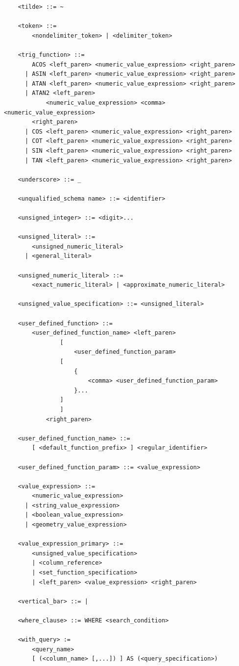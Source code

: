 \documentclass[11pt,a4paper]{ivoa}
\begin{document}
\begin{verbatim}
    <tilde> ::= ~

    <token> ::=
        <nondelimiter_token> | <delimiter_token>

    <trig_function> ::=
        ACOS <left_paren> <numeric_value_expression> <right_paren>
      | ASIN <left_paren> <numeric_value_expression> <right_paren>
      | ATAN <left_paren> <numeric_value_expression> <right_paren>
      | ATAN2 <left_paren>
            <numeric_value_expression> <comma> <numeric_value_expression>
        <right_paren>
      | COS <left_paren> <numeric_value_expression> <right_paren>
      | COT <left_paren> <numeric_value_expression> <right_paren>
      | SIN <left_paren> <numeric_value_expression> <right_paren>
      | TAN <left_paren> <numeric_value_expression> <right_paren>

    <underscore> ::= _

    <unqualified_schema name> ::= <identifier>

    <unsigned_integer> ::= <digit>...

    <unsigned_literal> ::=
        <unsigned_numeric_literal>
      | <general_literal>

    <unsigned_numeric_literal> ::=
        <exact_numeric_literal> | <approximate_numeric_literal>

    <unsigned_value_specification> ::= <unsigned_literal>

    <user_defined_function> ::=
        <user_defined_function_name> <left_paren>
                [
                    <user_defined_function_param>
                [
                    {
                        <comma> <user_defined_function_param>
                    }...
                ]
                ]
            <right_paren>

    <user_defined_function_name> ::=
        [ <default_function_prefix> ] <regular_identifier>

    <user_defined_function_param> ::= <value_expression>

    <value_expression> ::=
        <numeric_value_expression>
      | <string_value_expression>
      | <boolean_value_expression>
      | <geometry_value_expression>

    <value_expression_primary> ::=
        <unsigned_value_specification>
        | <column_reference>
        | <set_function_specification>
        | <left_paren> <value_expression> <right_paren>

    <vertical_bar> ::= |

    <where_clause> ::= WHERE <search_condition>

    <with_query> :=
        <query_name>
        [ (<column_name> [,...]) ] AS (<query_specification>)

\end{verbatim}
\end{document}
